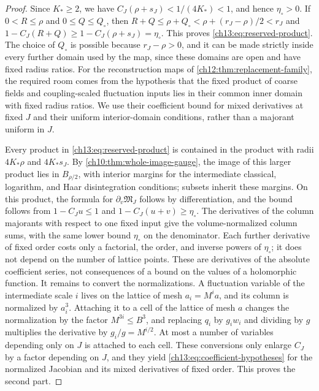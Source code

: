 \begin{proof}
Since $K_*\ge2$, we have $C_J(\rho+s_J)<1/(4K_*)<1$, and hence $\eta_\circ>0$. If $0<R\le\rho$ and $0\le Q\le Q_\circ$, then $R+Q\le\rho+Q_\circ<\rho+(r_J-\rho)/2<r_J$ and $1-C_J(R+Q)\ge1-C_J(\rho+s_J)=\eta_\circ$. This proves \eqref{ch13:eq:reserved-product}. The choice of $Q_\circ$ is possible because $r_J-\rho>0$, and it can be made strictly inside every further domain used by the map, since these domains are open and have fixed radius ratios. For the reconstruction maps of \cref{ch12:thm:replacement-family}, the required room comes from the hypothesis that the fixed product of coarse fields and coupling-scaled fluctuation inputs lies in their common inner domain with fixed radius ratios. We use their coefficient bound for mixed derivatives at fixed $J$ and their uniform interior-domain conditions, rather than a majorant uniform in $J$.

Every product in \eqref{ch13:eq:reserved-product} is contained in the product with radii $4K_*\rho$ and $4K_*s_J$. By \cref{ch10:thm:whole-image-gauge}, the image of this larger product lies in $B_{\rho/2}$, with interior margins for the intermediate classical, logarithm, and Haar disintegration conditions; subsets inherit these margins. On this product, the formula for $\partial_v\mathfrak M_J$ follows by differentiation, and the bound follows from $1-C_Ju\le1$ and $1-C_J(u+v)\ge\eta_\circ$. The derivatives of the column majorants with respect to one fixed input give the volume-normalized column sums, with the same lower bound $\eta_\circ$ on the denominator. Each further derivative of fixed order costs only a factorial, the order, and inverse powers of $\eta_\circ$; it does not depend on the number of lattice points. These are derivatives of the absolute coefficient series, not consequences of a bound on the values of a holomorphic function. It remains to convert the normalizations. A fluctuation variable of the intermediate scale $i$ lives on the lattice of mesh $a_i=M^ia$, and its column is normalized by $a_i^3$. Attaching it to a cell of the lattice of mesh $a$ changes the normalization by the factor $M^{3i}\le B^3$, and replacing $q_i$ by $g_iw_i$ and dividing by $g$ multiplies the derivative by $g_i/g=M^{i/2}$. At most a number of variables depending only on $J$ is attached to each cell. These conversions only enlarge $C_J$ by a factor depending on $J$, and they yield \eqref{ch13:eq:coefficient-hypotheses} for the normalized Jacobian and its mixed derivatives of fixed order. This proves the second part.


\end{proof}
